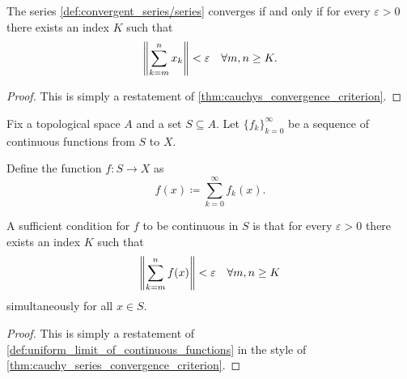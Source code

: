 \begin{proposition}\label{thm:cauchy_series_convergence_criterion}\cite[3.22]{Rudin1976}
  The series \cref{def:convergent_series/series} converges if and only if for every \( \varepsilon > 0 \) there exists an index \( K \) such that
  \begin{equation*}
    \left\Vert \sum_{k=m}^n x_k \right\Vert < \varepsilon \quad\forall m, n \geq K.
  \end{equation*}
\end{proposition}
\begin{proof}
  This is simply a restatement of \cref{thm:cauchys_convergence_criterion}.
\end{proof}

\begin{proposition}\label{thm:cauchy_series_continuity_criterion}\cite[]{Фихтенгольц1968/2}
  Fix a topological space \( A \) and a set \( S \subseteq A \). Let \( \{ f_k \}_{k=0}^\infty \) be a sequence of continuous functions from \( S \) to \( X \).

  Define the function \( f: S \to X \) as
  \begin{equation}\label{thm:cauchy_series_continuity_criterion/function}
    f(x) \coloneqq \sum_{k=0}^\infty f_k(x).
  \end{equation}

  A sufficient condition for \( f \) to be continuous in \( S \) is that for every \( \varepsilon > 0 \) there exists an index \( K \) such that
  \begin{equation*}
    \left\Vert \sum_{k=m}^n f(x) \right\Vert < \varepsilon \quad\forall m, n \geq K
  \end{equation*}
  simultaneously for all \( x \in S \).
\end{proposition}
\begin{proof}
  This is simply a restatement of \cref{def:uniform_limit_of_continuous_functions} in the style of \cref{thm:cauchy_series_convergence_criterion}.
\end{proof}

